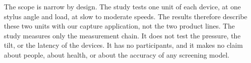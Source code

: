 The scope is narrow by design.
The study tests one unit of each device, at one stylus angle and load, at slow to moderate speeds.
The results therefore describe these two units with our capture application, not the two product lines.
The study measures only the measurement chain.
It does not test the pressure, the tilt, or the latency of the devices.
It has no participants, and it makes no claim about people, about health, or about the accuracy of any screening model.
